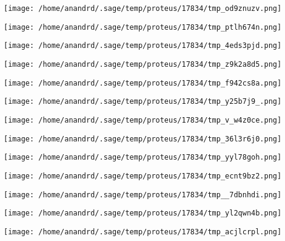 \documentclass[11pt]{article}
\begin{document}
\begin{center}
\texttt{[image: /home/anandrd/.sage/temp/proteus/17834/tmp\_od9znuzv.png]}
\end{center}
\begin{center}
\texttt{[image: /home/anandrd/.sage/temp/proteus/17834/tmp\_ptlh674n.png]}
\end{center}
\begin{center}
\texttt{[image: /home/anandrd/.sage/temp/proteus/17834/tmp\_4eds3pjd.png]}
\end{center}
\begin{center}
\texttt{[image: /home/anandrd/.sage/temp/proteus/17834/tmp\_z9k2a8d5.png]}
\end{center}
\begin{center}
\texttt{[image: /home/anandrd/.sage/temp/proteus/17834/tmp\_f942cs8a.png]}
\end{center}
\begin{center}
\texttt{[image: /home/anandrd/.sage/temp/proteus/17834/tmp\_y25b7j9\_.png]}
\end{center}
\begin{center}
\texttt{[image: /home/anandrd/.sage/temp/proteus/17834/tmp\_v\_w4z0ce.png]}
\end{center}
\begin{center}
\texttt{[image: /home/anandrd/.sage/temp/proteus/17834/tmp\_36l3r6j0.png]}
\end{center}
\begin{center}
\texttt{[image: /home/anandrd/.sage/temp/proteus/17834/tmp\_yyl78goh.png]}
\end{center}
\begin{center}
\texttt{[image: /home/anandrd/.sage/temp/proteus/17834/tmp\_ecnt9bz2.png]}
\end{center}
\begin{center}
\texttt{[image: /home/anandrd/.sage/temp/proteus/17834/tmp\_\_7dbnhdi.png]}
\end{center}
\begin{center}
\texttt{[image: /home/anandrd/.sage/temp/proteus/17834/tmp\_yl2qwn4b.png]}
\end{center}
\begin{center}
\texttt{[image: /home/anandrd/.sage/temp/proteus/17834/tmp\_acjlcrpl.png]}
\end{center}
\end{document}
